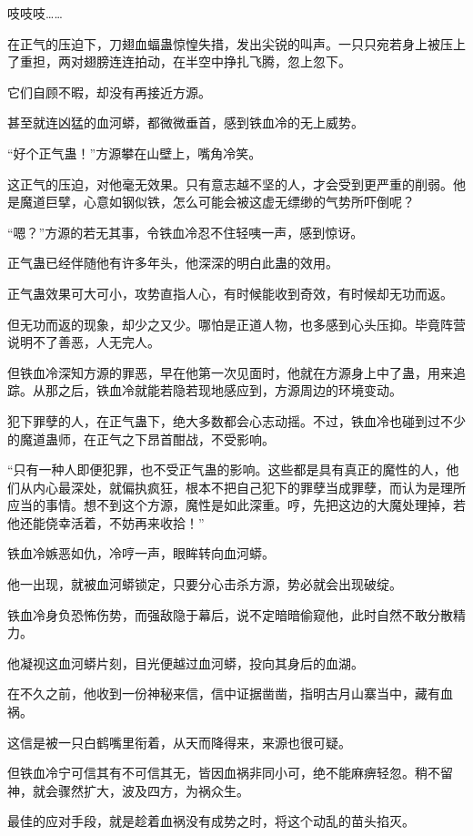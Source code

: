\begin{this_body}
吱吱吱……

在正气的压迫下，刀翅血蝠蛊惊惶失措，发出尖锐的叫声。一只只宛若身上被压上了重担，两对翅膀连连拍动，在半空中挣扎飞腾，忽上忽下。

它们自顾不暇，却没有再接近方源。

甚至就连凶猛的血河蟒，都微微垂首，感到铁血冷的无上威势。

“好个正气蛊！”方源攀在山壁上，嘴角冷笑。

这正气的压迫，对他毫无效果。只有意志越不坚的人，才会受到更严重的削弱。他是魔道巨擘，心意如钢似铁，怎么可能会被这虚无缥缈的气势所吓倒呢？

“嗯？”方源的若无其事，令铁血冷忍不住轻咦一声，感到惊讶。

正气蛊已经伴随他有许多年头，他深深的明白此蛊的效用。

正气蛊效果可大可小，攻势直指人心，有时候能收到奇效，有时候却无功而返。

但无功而返的现象，却少之又少。哪怕是正道人物，也多感到心头压抑。毕竟阵营说明不了善恶，人无完人。

但铁血冷深知方源的罪恶，早在他第一次见面时，他就在方源身上中了蛊，用来追踪。从那之后，铁血冷就能若隐若现地感应到，方源周边的环境变动。

犯下罪孽的人，在正气蛊下，绝大多数都会心志动摇。不过，铁血冷也碰到过不少的魔道蛊师，在正气之下昂首酣战，不受影响。

“只有一种人即便犯罪，也不受正气蛊的影响。这些都是具有真正的魔性的人，他们从内心最深处，就偏执疯狂，根本不把自己犯下的罪孽当成罪孽，而认为是理所应当的事情。想不到这个方源，魔性是如此深重。哼，先把这边的大魔处理掉，若他还能侥幸活着，不妨再来收拾！”

铁血冷嫉恶如仇，冷哼一声，眼眸转向血河蟒。

他一出现，就被血河蟒锁定，只要分心击杀方源，势必就会出现破绽。

铁血冷身负恐怖伤势，而强敌隐于幕后，说不定暗暗偷窥他，此时自然不敢分散精力。

他凝视这血河蟒片刻，目光便越过血河蟒，投向其身后的血湖。

在不久之前，他收到一份神秘来信，信中证据凿凿，指明古月山寨当中，藏有血祸。

这信是被一只白鹤嘴里衔着，从天而降得来，来源也很可疑。

但铁血冷宁可信其有不可信其无，皆因血祸非同小可，绝不能麻痹轻忽。稍不留神，就会骤然扩大，波及四方，为祸众生。

最佳的应对手段，就是趁着血祸没有成势之时，将这个动乱的苗头掐灭。


\end{this_body}
